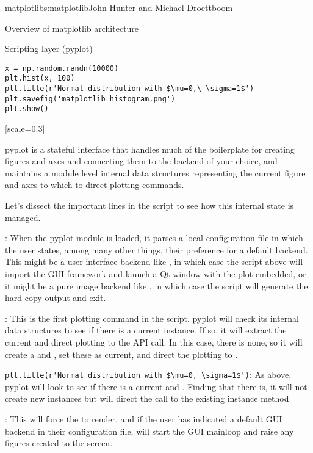 \begin{aosachapter}{matplotlib}{s:matplotlib}{John Hunter and Michael Droettboom}
\begin{aosasect1}{Overview of matplotlib architecture}
\begin{aosasect2}{Scripting layer (pyplot)}
\begin{verbatim}
x = np.random.randn(10000)
plt.hist(x, 100)
plt.title(r'Normal distribution with $\mu=0,\ \sigma=1$')
plt.savefig('matplotlib_histogram.png')
plt.show()
\end{verbatim}

[scale=0.3]


pyplot is a stateful interface that handles much of the boilerplate
for creating figures and axes and connecting them to the backend of
your choice, and maintains a module level internal data structures
representing the current figure and axes to which to direct plotting
commands.

Let's dissect the important lines in the script to see how this
internal state is managed.

\begin{aosaitemize}

\item {}: When the pyplot module
  is loaded, it parses a local configuration file in which the user
  states, among many other things, their preference for a default
  backend.  This might be a user interface backend like ,
  in which case the script above will import the GUI framework and
  launch a Qt window with the plot embedded, or it might be a pure
  image backend like , in which case the script will
  generate the hard-copy output and exit.

\item {}: This is the first plotting command in
  the script.  pyplot will check its internal data structures to see
  if there is a current  instance.  If so, it will
  extract the current  and direct plotting to the
   API call.  In this case, there is none, so it will
  create a  and , set these as current, and
  direct the plotting to .

\item \verb+plt.title(r'Normal distribution with $\mu=0, \sigma=1$')+:
  As above, pyplot will look to see if there is a
  current  and .  Finding that there is, it
  will not create new instances but will direct the call to the
  existing  instance method 

\item {}: This will force the  to render,
  and if the user has indicated a default GUI backend in their
  configuration file, will start the GUI mainloop and raise any
  figures created to the screen.


\end{aosaitemize}
\end{aosasect2}
\end{aosasect1}
\end{aosachapter}
